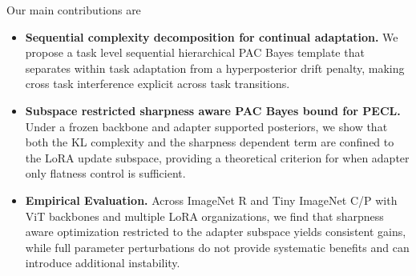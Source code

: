 \documentclass{article}
\theoremstyle{plain}
\theoremstyle{definition}
\theoremstyle{remark}
\begin{document}







Our main contributions are
\begin{itemize}
\item \textbf{Sequential complexity decomposition for continual adaptation.} We propose a task level sequential hierarchical PAC Bayes template that separates within task adaptation from a hyperposterior drift penalty, making cross task interference explicit across task transitions.
\item \textbf{Subspace restricted sharpness aware PAC Bayes bound for PECL.} Under a frozen backbone and adapter supported posteriors, we show that both the KL complexity and the sharpness dependent term are confined to the LoRA update subspace, providing a theoretical criterion for when adapter only flatness control is sufficient.
\item \textbf{Empirical Evaluation.}  Across ImageNet R and Tiny ImageNet C/P with ViT backbones and multiple LoRA organizations, we find that sharpness aware optimization restricted to the adapter subspace yields consistent gains, while full parameter perturbations do not provide systematic benefits and can introduce additional instability.
\end{itemize}
\end{document}
